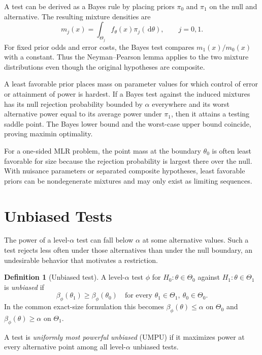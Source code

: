 \documentclass[12pt,oneside]{book}
\numberwithin{equation}{section}
\theoremstyle{definition}
\newtheorem{definition}{Definition}[section]
\theoremstyle{plain}
\theoremstyle{remark}
\newcommand{\dd}{\,\mathrm{d}}
\begin{document}
A test can be derived as a Bayes rule by placing priors $\pi_0$ and $\pi_1$ on
the null and alternative.  The resulting mixture densities are
\[
    m_j(x)=\int_{\Theta_j}f_\theta(x)\pi_j(\dd\theta),
    \qquad j=0,1.
\]
For fixed prior odds and error costs, the Bayes test compares
$m_1(x)/m_0(x)$ with a constant.  Thus the Neyman--Pearson lemma applies to
the two mixture distributions even though the original hypotheses are
composite.

A least favorable prior places mass on parameter values for which control of
error or attainment of power is hardest.  If a Bayes test against the induced
mixtures has its null rejection probability bounded by $\alpha$ everywhere
and its worst alternative power equal to its average power under $\pi_1$,
then it attains a testing saddle point.  The Bayes lower bound and the
worst-case upper bound coincide, proving maximin optimality.

For a one-sided MLR problem, the point mass at the boundary $\theta_0$ is
often least favorable for size because the rejection probability is largest
there over the null.  With nuisance parameters or separated composite
hypotheses, least favorable priors can be nondegenerate mixtures and may only
exist as limiting sequences.

\section{Unbiased Tests}

The power of a level-$\alpha$ test can fall below $\alpha$ at some alternative
values.  Such a test rejects less often under those alternatives than under
the null boundary, an undesirable behavior that motivates a restriction.

\begin{definition}[Unbiased test]
A level-$\alpha$ test $\phi$ for $H_0:\theta\in\Theta_0$ against
$H_1:\theta\in\Theta_1$ is \emph{unbiased} if
\[
 \beta_\phi(\theta_1)\geq\beta_\phi(\theta_0)
 \quad\text{for every }\theta_1\in\Theta_1,
 \ \theta_0\in\Theta_0.
\]
In the common exact-size formulation this becomes
$\beta_\phi(\theta)\leq\alpha$ on $\Theta_0$ and
$\beta_\phi(\theta)\geq\alpha$ on $\Theta_1$.
\end{definition}

A test is \emph{uniformly most powerful unbiased} (UMPU) if it maximizes
power at every alternative point among all level-$\alpha$ unbiased tests.
\end{document}
